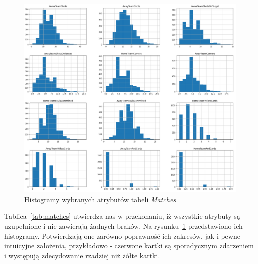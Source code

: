      \begin{figure}[H] 
        \centering\includegraphics[width=\textwidth]{figures/matches.png}
        \caption{Histogramy wybranych atrybutów tabeli \emph{Matches}}
        \label{fig:matches}
    \end{figure}
    
    \noindent Tablica~\ref{tab:matches} utwierdza nas w przekonaniu, iż wszystkie atrybuty są uzupełnione i nie zawierają żadnych braków.
    Na rysunku~\ref{fig:matches} przedstawiono ich histogramy. Potwierdzają one zarówno poprawność ich zakresów, jak i pewne intuicyjne założenia, przykładowo - czerwone kartki są sporadycznym zdarzeniem i występują zdecydowanie rzadziej niż żółte kartki. 
    

